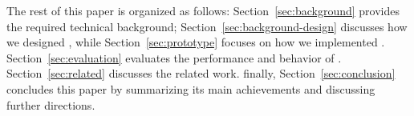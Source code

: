 
The rest of this paper is organized as follows: Section~\ref{sec:background}
provides the required technical background; Section~\ref{sec:background-design}
discusses how we designed \tcpls, while Section~\ref{sec:prototype} focuses on 
how
we implemented \tcpls. Section~\ref{sec:evaluation} evaluates the performance 
and
behavior of \tcpls. Section~\ref{sec:related} discusses the related work.  
finally, Section~\ref{sec:conclusion} concludes this paper by
summarizing its main achievements and discussing further directions.
